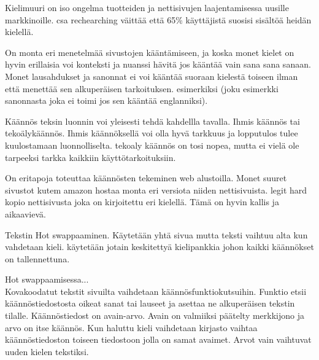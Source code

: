 \documentclass[11pt,a4paper,titlepage,oneside]{article}
\begin{document}



Kielimuuri on iso ongelma tuotteiden ja nettisivujen laajentamisessa uusille markkinoille.
csa rechearching väittää että 65\% käyttäjistä suosisi sisältöä heidän kielellä.
\medskip






On monta eri menetelmää sivustojen kääntämiseen, 
ja koska monet kielet on hyvin erillaisia voi konteksti ja nuanssi hävitä jos kääntää vain sana sana sanaan.
Monet lausahdukset ja sanonnat ei voi kääntää suoraan kielestä toiseen ilman että menettää sen alkuperäisen tarkoituksen.
esimerkiksi (joku esimerkki sanonnasta joka ei toimi jos sen kääntää englanniksi).
\medskip


Käännös teksin luonnin voi yleisesti tehdä kahdellla tavalla. Ihmis käännös tai tekoälykäännös.
Ihmis käännöksellä voi olla hyvä tarkkuus ja lopputulos tulee kuulostamaan luonnolliselta.
tekoaly käännös on tosi nopea, mutta ei vielä ole tarpeeksi tarkka kaikkiin käyttötarkoituksiin.
\medskip






On eritapoja toteuttaa käännösten tekeminen web alustoilla. Monet suuret sivustot kutem amazon \citemissing{} 
hostaa monta eri versiota niiden nettisivuista.
legit hard kopio nettisivusta joka on kirjoitettu eri kielellä. Tämä on hyvin kallis ja aikaavievä.

Tekstin Hot swappaaminen. Käytetään yhtä sivua mutta teksti vaihtuu alta kun vahdetaan kieli. \citemissing{}
käytetään jotain keskitettyä kielipankkia johon kaikki käännökset on tallennettuna.
\medskip


Hot swappaamisessa...\\
Kovakoodatut tekstit sivuilta vaihdetaan käännösfunktiokutsuihin.
Funktio etsii käännöstiedostosta oikeat sanat tai lauseet ja asettaa ne alkuperäisen tekstin tilalle. 
Käännöstiedost on avain-arvo. %
Avain on valmiiksi päätelty merkkijono ja arvo on itse käännös. 
Kun haluttu kieli vaihdetaan kirjasto vaihtaa käännöstiedoston toiseen tiedostoon jolla on samat avaimet. 
Arvot vain vaihtuvat uuden kielen tekstiksi.\citemissing
\medskip
\end{document}
